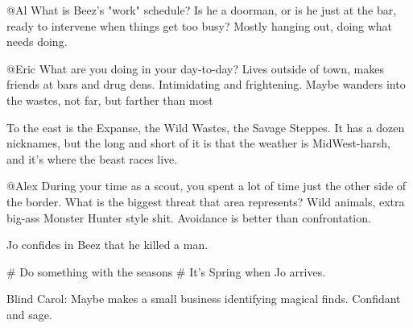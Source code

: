 @Al
What is Beez's "work" schedule?
Is he a doorman, or is he just at the bar, ready to intervene when things get too busy?
  Mostly hanging out, doing what needs doing.

@Eric
What are you doing in your day-to-day?
  Lives outside of town, makes friends at bars and drug dens.
  Intimidating and frightening.
  Maybe wanders into the wastes, not far, but farther than most

To the east is the Expanse, the Wild Wastes, the Savage Steppes.
It has a dozen nicknames, but the long and short of it is that the weather is MidWest-harsh,
  and it's where the beast races live.

@Alex
During your time as a scout, you spent a lot of time just the other side of the border.
  What is the biggest threat that area represents?
    Wild animals, extra big-ass Monster Hunter style shit.
    Avoidance is better than confrontation.

  Jo confides in Beez that he killed a man.

# Do something with the seasons
# It's Spring when Jo arrives.


Blind Carol:
  Maybe makes a small business identifying magical finds.
  Confidant and sage.

